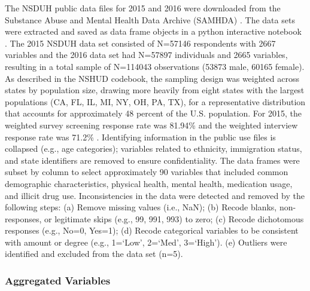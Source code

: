 \documentclass[sigconf]{acmart}
\begin{document}
The NSDUH public data files for 2015 and 2016 were downloaded from the
Substance Abuse and Mental Health Data Archive (SAMHDA) \cite{samhsa18}. 
The data sets were extracted and saved as data frame objects in a python 
interactive notebook \cite{mckinney17, vanderplas17}. The 2015 NSDUH data set 
consisted of N=57146 respondents with 2667 variables and the 2016 data set had 
N=57897 individuals and 2665 variables, resulting in a total sample of N=114043 
observations (53873 male, 60165 female). As described in the NSHUD codebook, 
the sampling design was weighted across states by population size, drawing more 
heavily from eight states with the largest populations (CA, FL, IL, MI, NY, OH, 
PA, TX), for a representative distribution that accounts for approximately 
48 percent of the U.S. population. For 2015, the weighted survey screening 
response rate  was 81.94\% and the weighted interview response rate was 71.2\% 
\cite{samhsa18}. Identifying information in the public use files is collapsed 
(e.g., age categories); variables related to ethnicity, immigration status, and 
state identifiers are removed to ensure confidentiality. The data frames were 
subset by column to select approximately 90 variables that included common 
demographic characteristics, physical health, mental health, medication usage, 
and illicit drug use. Inconsistencies in the data were detected and removed by
the following steps: (a) Remove missing values (i.e., NaN); (b) Recode blanks, 
non-responses, or legitimate skips (e.g., 99, 991, 993) to zero; (c) Recode 
dichotomous responses (e.g., No=0, Yes=1); (d) Recode categorical variables 
to be consistent with amount or degree  (e.g., 1=`Low', 2=`Med', 3=`High'). 
(e) Outliers were identified and excluded from the data set (n=5).


\subsubsection{Aggregated Variables}
\end{document}

